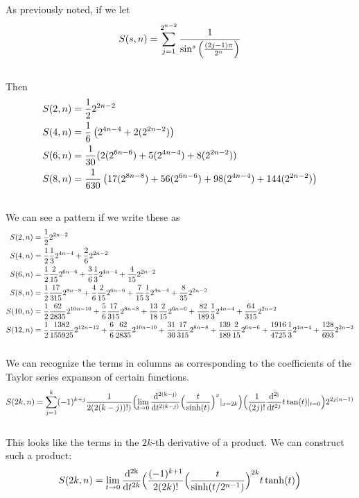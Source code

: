 \documentclass[fleqn,a4paper,9pt]{article}
\begin{document}
\begin{flushleft}
As previously noted, if we let
\begin{align}\notag
S(s,n)&=\sum_{j=1}^{2^{n-2}}\frac{1}{\sin^s\left(\frac{(2j-1)\pi}{2^n}\right)}\\\notag
\end{align}
Then
\begin{align}\notag
S(2,n)&=\frac{1}{2}2^{2n-2}\\\notag
S(4,n)&=\frac{1}{6}\left(2^{4n-4}+2(2^{2n-2})\right)\\\notag
S(6,n)&=\frac{1}{30}(2(2^{6n-6})+5(2^{4n-4})+8(2^{2n-2}))\\\notag
S(8,n)&=\frac{1}{630}\left(17(2^{8n-8})+56(2^{6n-6})+98(2^{4n-4})+144(2^{2n-2})\right)\\\notag
\end{align}
We can see a pattern if we write these as
\begin{align}\notag
S(2,n)&=\frac{1}{2}2^{2n-2}\\\notag
S(4,n)&=\frac{1}{2}\frac{1}{3}2^{4n-4}+\frac{2}{6}2^{2n-2}\\\notag
S(6,n)&=\frac{1}{2}\frac{2}{15}2^{6n-6}+\frac{3}{6}\frac{1}{3}2^{4n-4}+\frac{4}{15}2^{2n-2}\\\notag
S(8,n)&=\frac{1}{2}\frac{17}{315}2^{8n-8}+\frac{4}{6}\frac{2}{15}2^{6n-6}+\frac{7}{15}\frac{1}{3}2^{4n-4}+\frac{8}{35}2^{2n-2}\\\notag
S(10,n)&=\frac{1}{2}\frac{62}{2835}2^{10n-10}+\frac{5}{6}\frac{17}{315}2^{8n-8}+\frac{13}{18}\frac{2}{15}2^{6n-6}+\frac{82}{189}\frac{1}{3}2^{4n-4}+\frac{64}{315}2^{2n-2}\\\notag
S(12,n)&=\frac{1}{2}\frac{1382}{155925}2^{12n-12}+\frac{6}{6}\frac{62}{2835}2^{10n-10}+\frac{31}{30}\frac{17}{315}2^{8n-8}+\frac{139}{189}\frac{2}{15}2^{6n-6}+\frac{1916}{4725}\frac{1}{3}2^{4n-4}+\frac{128}{693}2^{2n-2}\\\notag
\end{align}
We can recognize the terms in columns as corresponding to the coefficients of the Taylor series expanson of certain functions.
\begin{align}\notag
S(2 k,n)&=\sum_{j=1}^k(-1)^{k+j}\frac{1}{2(2(k-j))!)}\Bigl(\lim_{t\to 0}\frac{  \mathrm{  d^{2(k-j)}  }   }{\mathrm{d}t^{2(k-j)}  }        \Bigl(\frac{t}{\sinh(t)}\Bigr)^x\vert_{x=2 k}\Bigr)\Bigl(\frac{1}{(2j)!}\frac{\mathrm{  d^{2j}  }  }{\mathrm{d}t^{2j}}  t\tan(t)\vert_{t=0}\Bigr)2^{2 j (n-1)}\\\notag
\end{align}
This looks like the terms in the $2k$-th derivative of a product. We can construct such a product:
\begin{align}
S(2k,n)&=\lim_{t\to 0}\frac{  \mathrm{  d^{2k}  }   }{\mathrm{d}t^{2k}  }  \Bigl( \frac{(-1)^{k+1}}{2(2k)!}     \Bigl(\frac{ t}{\sinh(t/2^{n-1})}\Bigr)^{2k} t\tanh(t)\Bigr)\\\notag
\end{align}


\end{flushleft}
\end{document}
